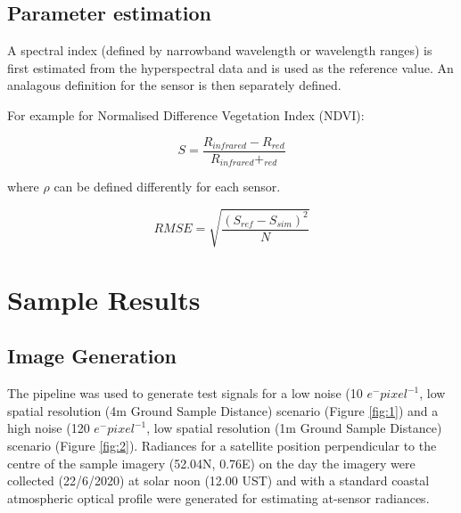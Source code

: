 \documentclass[10pt,a4paper,final,twocolumn]{article}
\begin{document}
\subsection{Parameter estimation}
A spectral index (defined by narrowband wavelength or wavelength ranges) is first estimated from the hyperspectral data and is used as the reference value. An analagous definition for the sensor is then separately defined.

For example for Normalised Difference Vegetation Index (NDVI):

\begin{equation}
S = \frac{R_{infrared} - R_{red}}{R_{infrared} + _{red}}
\end{equation}

where $\rho$ can be defined differently for each sensor.

\begin{equation}
RMSE = \sqrt{\frac{(S_{ref}-S_{sim})^{2}}{N}}
\end{equation}

\section{Sample Results}
\subsection{Image Generation}
The pipeline was used to generate test signals for a low noise (10 $e^- pixel ^{-1}$, low spatial resolution (4m Ground Sample Distance) scenario (Figure \ref{fig:1}) and  a high noise (120 $e^- pixel ^{-1}$, low spatial resolution (1m Ground Sample Distance) scenario (Figure \ref{fig:2}). Radiances for a satellite position perpendicular to the centre of the sample imagery (52.04N, 0.76E) on the day the imagery were collected (22/6/2020) at solar noon (12.00 UST) and with a standard coastal atmospheric optical profile were generated for estimating at-sensor radiances.

\begin{figure*}
\caption{Sample simulated signals (4m GSD, dark noise=10) using a pipeline based on Sentinel-2 VNIR bands and a CCD sensor. The input hyperspectral (A), simulated RGB (B), Predicted false colour NIR (C), Normalised Difference Vegetation Index (D) are shown as images and example input reflectance spectra (E) and example simulated reflectance spectra (F) are shown as line plots. }
\label{fig:1}
\end{figure*}
\end{document}
